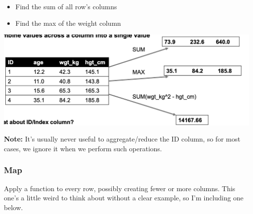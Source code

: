 \documentclass[english, 10pt]{article}
\begin{document}
\begin{itemize}
	\item Find the sum of all row's columns
	\item Find the max of the weight column
\end{itemize}
\begin{center}
	\includegraphics[scale=0.4]{img/Aggregate.png}
\end{center}
\textbf{Note:} It's usually never useful to aggregate/reduce the ID column, so for most cases, we ignore it when we perform such operations.

\subsubsection{Map}

Apply a function to every row, possibly creating fewer or more columns. This one's a little weird to think about without a clear example, so I'm including one below.\\
\end{document}
